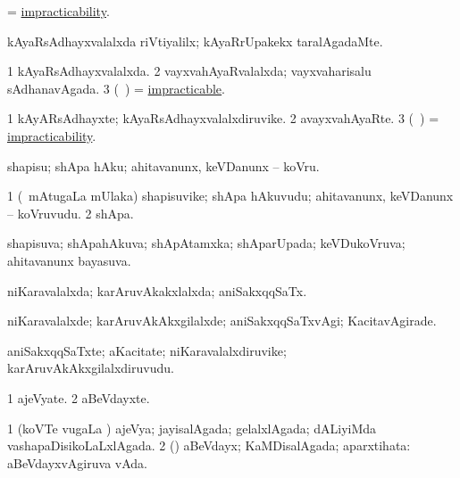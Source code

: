 \bentry
{}
\gl{\nA}
\bmng
 = \hyperlink{impracticability}{impracticability}. 
\emng
\eentry

\bentry
{}
\gl{\kirxvi}
\bmng
kAyaRsAdhayxvalalxda riVtiyalilx; kAyaRrUpakekx taralAgadaMte. 
\emng
\eentry

\bentry
{}
\gl{\gu}
\bmng
\bnum
\num{1} kAyaRsAdhayxvalalxda. 
\num{2} vayxvahAyaRvalalxda; vayxvaharisalu sAdhanavAgada. 
\num{3} (\kanmu\ \ame)  = \hyperlink{impracticable}{impracticable}. 
\enum
\emng
\eentry

\bentry
{}
\gl{\nA}
\bmng
\bnum
\num{1} kAyARsAdhayxte; kAyaRsAdhayxvalalxdiruvike. 
\num{2} avayxvahAyaRte. 
\num{3} (\kanmu\ \ame)  = \hyperlink{impracticability}{impracticability}. 
\enum
\emng
\eentry

\bentry
{}
\gl{\sakirx}
\bmng
shapisu; shApa hAku; ahitavanunx, keVDanunx -- koVru. 
\emng
\eentry

\bentry
{}
\gl{\nA}
\bmng
\bnum
\num{1} (\kanmu\ mAtugaLa mUlaka) shapisuvike; shApa hAkuvudu; ahitavanunx, keVDanunx -- koVruvudu. 
\num{2} shApa. 
\enum
\emng
\eentry

\bentry
{}
\gl{\gu}
\bmng
shapisuva; shApahAkuva; shApAtamxka; shAparUpada; keVDukoVruva; ahitavanunx bayasuva. 
\emng
\eentry

\bentry
{}
\gl{\gu}
\bmng
niKaravalalxda; karAruvAkakxlalxda; aniSakxqqSaTx. 
\emng
\eentry

\bentry
{}
\gl{\kirxvi}
\bmng
niKaravalalxde; karAruvAkAkxgilalxde; aniSakxqqSaTxvAgi; KacitavAgirade. 
\emng
\eentry

\bentry
{}
\gl{\nA}
\bmng
aniSakxqqSaTxte; aKacitate; niKaravalalxdiruvike; karAruvAkAkxgilalxdiruvudu. 
\emng
\eentry

\bentry
{}
\gl{\nA}
\bmng
\bnum
\num{1} ajeVyate. 
\num{2} aBeVdayxte. 
\enum
\emng
\eentry

\bentry
{}
\gl{\gu}
\bmng
\bnum
\num{1} (koVTe \mo vugaLa \vi) ajeVya; jayisalAgada; gelalxlAgada; dALiyiMda vashapaDisikoLaLxlAgada. 
\num{2} (\rUpa) aBeVdayx; KaMDisalAgada; aparxtihata:  aBeVdayxvAgiruva vAda. 
\enum
\emng
\eentry

